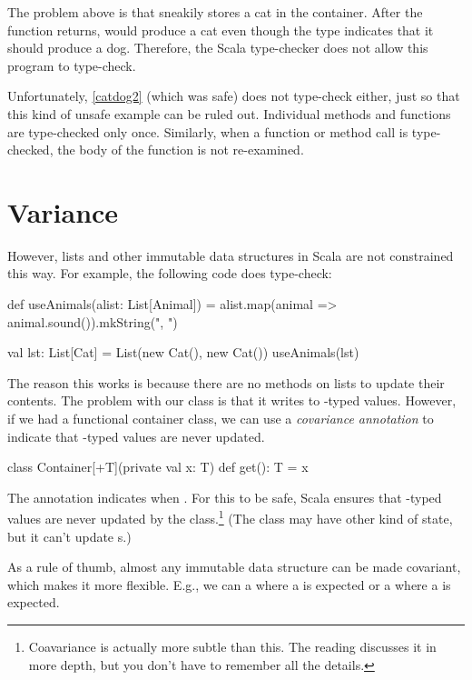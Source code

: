 \documentclass{book}
\begin{document}
The problem above is that  sneakily stores a cat in
the container. After the function returns,  would produce
a cat even though the type indicates that it should produce a dog.
Therefore, the Scala type-checker does not allow this program to type-check.

Unfortunately, \cref{catdog2} (which was safe) does not type-check either, just so that
this kind of unsafe example can be ruled out. Individual methods and functions
are type-checked only once. Similarly, when a function or method call is type-checked,
the body of the function is not re-examined.

\section{Variance}

However, lists and other immutable data structures in Scala are not constrained
this way. For example, the following code does type-check:

\begin{scalacode}
def useAnimals(alist: List[Animal]) = {
  alist.map(animal => animal.sound()).mkString(", ")
}

val lst: List[Cat] = List(new Cat(), new Cat())
useAnimals(lst)
\end{scalacode}

The reason this works is because there are no methods on lists to update
their contents. The problem with our  class is
that it writes to -typed values. However, if we had a functional
container class, we can use a \emph{covariance annotation} to indicate
that -typed values are never updated.

\begin{scalacode}
class Container[+T](private val x: T) {
  def get(): T = x
}
\end{scalacode}

The  annotation indicates  when . For this to be safe,
Scala ensures that -typed values are never updated
by the class.\footnote{Coavariance is actually more subtle than this. The reading discusses it in more depth, but you don't have to remember all the details.} (The class may have other kind of state, but it can't
update s.)

As a rule of thumb, almost any immutable data structure can be made
covariant, which makes it more flexible. E.g., we can a 
where a  is expected or a 
where a  is expected.
\end{document}
